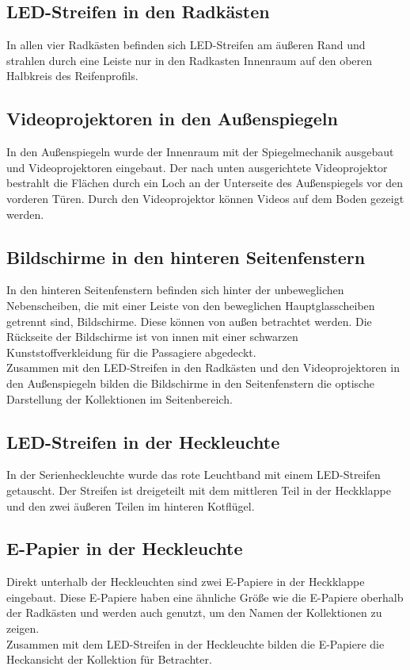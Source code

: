 \subsection{LED-Streifen in den Radkästen}
In allen vier Radkästen befinden sich LED-Streifen am äußeren Rand und strahlen durch eine Leiste nur in den Radkasten Innenraum auf den oberen Halbkreis des Reifenprofils. 
\subsection{Videoprojektoren in den Außenspiegeln}
In den Außenspiegeln wurde der Innenraum mit der Spiegelmechanik ausgebaut und Videoprojektoren eingebaut. Der nach unten ausgerichtete Videoprojektor bestrahlt die Flächen durch ein Loch an der Unterseite des Außenspiegels vor den vorderen Türen.
Durch den Videoprojektor können Videos auf dem Boden gezeigt werden.
\subsection{Bildschirme in den hinteren Seitenfenstern}
In den hinteren Seitenfenstern befinden sich hinter der unbeweglichen Nebenscheiben, die mit einer Leiste von den beweglichen Hauptglasscheiben getrennt sind, Bildschirme. Diese können von außen betrachtet werden. Die Rückseite der Bildschirme ist von innen mit einer schwarzen Kunststoffverkleidung für die Passagiere abgedeckt.\\
Zusammen mit den LED-Streifen in den Radkästen und den Videoprojektoren in den Außenspiegeln bilden die Bildschirme in den Seitenfenstern die optische Darstellung der Kollektionen im Seitenbereich.
\subsection{LED-Streifen in der Heckleuchte}
In der Serienheckleuchte wurde das rote Leuchtband mit einem LED-Streifen getauscht. Der Streifen ist dreigeteilt mit dem mittleren Teil in der Heckklappe und den zwei äußeren Teilen im hinteren Kotflügel.
\subsection{E-Papier in der Heckleuchte}
Direkt unterhalb der Heckleuchten sind zwei E-Papiere in der Heckklappe eingebaut.
Diese E-Papiere haben eine ähnliche Größe wie die E-Papiere oberhalb der Radkästen und werden auch genutzt, um den Namen der Kollektionen zu zeigen.\\
Zusammen mit dem LED-Streifen in der Heckleuchte bilden die E-Papiere die Heckansicht der Kollektion für Betrachter.
